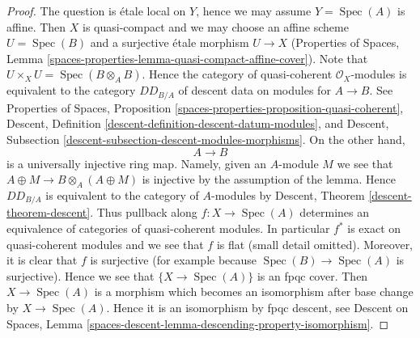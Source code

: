 \documentclass[10pt,a4paper]{amsart}
\theoremstyle{plain}
\theoremstyle{definition}
\theoremstyle{remark}
\numberwithin{equation}{subsection}
\def\Spec{\mathop{\mathrm{Spec}}}
\begin{document}
\begin{proof}
The question is \'etale local on $Y$, hence we may assume $Y = \Spec(A)$
is affine. Then $X$ is quasi-compact and we may choose an affine scheme
$U = \Spec(B)$ and a surjective \'etale morphism $U \to X$
(Properties of Spaces, Lemma
\ref{spaces-properties-lemma-quasi-compact-affine-cover}).
Note that $U \times_X U = \Spec(B \otimes_A B)$. Hence the category of
quasi-coherent $\mathcal{O}_X$-modules is equivalent to the
category $DD_{B/A}$ of descent data on modules for $A \to B$.
See Properties of Spaces, Proposition
\ref{spaces-properties-proposition-quasi-coherent},
Descent, Definition \ref{descent-definition-descent-datum-modules}, and
Descent, Subsection \ref{descent-subsection-descent-modules-morphisms}.
On the other hand,
$$
A \to B
$$
is a universally injective ring map. Namely, given an
$A$-module $M$ we see that $A \oplus M \to B \otimes_A (A \oplus M)$
is injective by the assumption of the lemma. Hence
$DD_{B/A}$ is equivalent to the category of $A$-modules by
Descent, Theorem \ref{descent-theorem-descent}. Thus pullback along
$f : X \to \Spec(A)$ determines an equivalence of categories of
quasi-coherent modules. In particular $f^*$ is exact on
quasi-coherent modules and we see that $f$ is flat
(small detail omitted). Moreover, it is clear that $f$ is surjective
(for example because $\Spec(B) \to \Spec(A)$ is surjective).
Hence we see that $\{X \to \Spec(A)\}$ is an fpqc cover.
Then $X \to \Spec(A)$ is a morphism which becomes an isomorphism
after base change by $X \to \Spec(A)$. Hence it is an isomorphism by
fpqc descent, see Descent on Spaces, Lemma
\ref{spaces-descent-lemma-descending-property-isomorphism}.
\end{proof}
\end{document}

